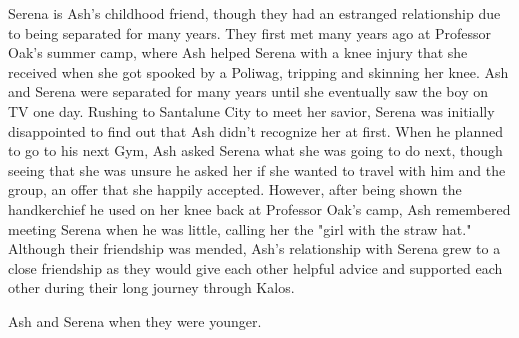 \documentclass[a4paper,12pt]{article}
\begin{document}
Serena is Ash's childhood friend, though they had an estranged relationship due to being separated for many years. They first met many years ago at Professor Oak's summer camp, where Ash helped Serena with a knee injury that she received when she got spooked by a Poliwag, tripping and skinning her knee. Ash and Serena were separated for many years until she eventually saw the boy on TV one day. Rushing to Santalune City to meet her savior, Serena was initially disappointed to find out that Ash didn't recognize her at first. When he planned to go to his next Gym, Ash asked Serena what she was going to do next, though seeing that she was unsure he asked her if she wanted to travel with him and the group, an offer that she happily accepted. However, after being shown the handkerchief he used on her knee back at Professor Oak's camp, Ash remembered meeting Serena when he was little, calling her the "girl with the straw hat." Although their friendship was mended, Ash's relationship with Serena grew to a close friendship as they would give each other helpful advice and supported each other during their long journey through Kalos.\\ \par \vspace{0.5cm}

Ash and Serena when they were younger.\\ \par \vspace{0.5cm}
\end{document}
